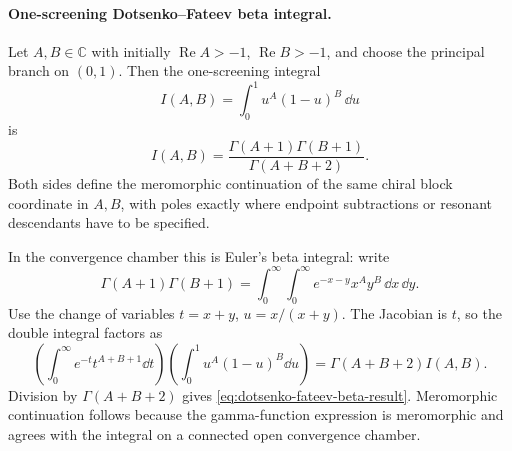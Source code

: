 \paragraph{One-screening Dotsenko--Fateev beta integral.}
Let \(A,B\in\mathbb C\) with initially
\(\operatorname{Re}A>-1\), \(\operatorname{Re}B>-1\), and choose the principal
branch on \((0,1)\).  Then the one-screening integral
\begin{equation}
  I(A,B)=\int_0^1 u^A(1-u)^B\,\dd u
  \label{eq:dotsenko-fateev-beta-integral}
\end{equation}
is
\begin{equation}
  I(A,B)
  =
  \frac{\Gamma(A+1)\Gamma(B+1)}
       {\Gamma(A+B+2)}.
  \label{eq:dotsenko-fateev-beta-result}
\end{equation}
Both sides define the meromorphic continuation of the same chiral block
coordinate in \(A,B\), with poles exactly where endpoint subtractions or
resonant descendants have to be specified.

In the convergence chamber this is Euler's beta integral: write
\[
  \Gamma(A+1)\Gamma(B+1)
  =
  \int_0^\infty\!\!\int_0^\infty
  e^{-x-y}x^A y^B\,\dd x\,\dd y.
\]
Use the change of variables \(t=x+y\), \(u=x/(x+y)\).  The Jacobian is
\(t\), so the double integral factors as
\[
  \left(\int_0^\infty e^{-t}t^{A+B+1}\dd t\right)
  \left(\int_0^1u^A(1-u)^B\dd u\right)
  =
  \Gamma(A+B+2)I(A,B).
\]
Division by \(\Gamma(A+B+2)\) gives
\eqref{eq:dotsenko-fateev-beta-result}.  Meromorphic continuation follows
because the gamma-function expression is meromorphic and agrees with the
integral on a connected open convergence chamber.

